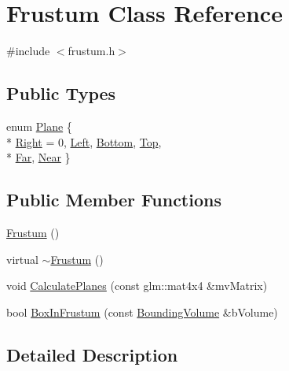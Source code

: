 \hypertarget{class_frustum}{}\section{Frustum Class Reference}
\label{class_frustum}


{\ttfamily \#include $<$frustum.\+h$>$}

\subsection*{Public Types}
\begin{DoxyCompactItemize}
\item 
enum \hyperlink{class_frustum_ab13c65bf33cca74e109102b20fe89618}{Plane} \{ \\*
\hyperlink{class_frustum_ab13c65bf33cca74e109102b20fe89618a2961bf301b55c811a8435c4000c152a5}{Right} = 0, 
\hyperlink{class_frustum_ab13c65bf33cca74e109102b20fe89618ad607091e013acc67ae312b4c61963226}{Left}, 
\hyperlink{class_frustum_ab13c65bf33cca74e109102b20fe89618a1025204d654a9505265ec18e87503f46}{Bottom}, 
\hyperlink{class_frustum_ab13c65bf33cca74e109102b20fe89618a623424434c3e752ad4e206c9da93d1e3}{Top}, 
\\*
\hyperlink{class_frustum_ab13c65bf33cca74e109102b20fe89618afd3ac9bb34d2a501bccc633ab63ddd3b}{Far}, 
\hyperlink{class_frustum_ab13c65bf33cca74e109102b20fe89618a9b3693612ae3f8ddf27458309b83be64}{Near}
 \}
\end{DoxyCompactItemize}
\subsection*{Public Member Functions}
\begin{DoxyCompactItemize}
\item 
\hyperlink{class_frustum_a172ae3492592e3ac891642299d628494}{Frustum} ()
\item 
virtual \hyperlink{class_frustum_ab02405770e9189e2e8edf51a3955bde2}{$\sim$\+Frustum} ()
\item 
void \hyperlink{class_frustum_a53a30457a28c43b1cfeee487646ca8b2}{Calculate\+Planes} (const glm\+::mat4x4 \&mv\+Matrix)
\item 
bool \hyperlink{class_frustum_acbbcf180fa80aa2b4fca53be69ab3636}{Box\+In\+Frustum} (const \hyperlink{class_bounding_volume}{Bounding\+Volume} \&b\+Volume)
\end{DoxyCompactItemize}


\subsection{Detailed Description}


